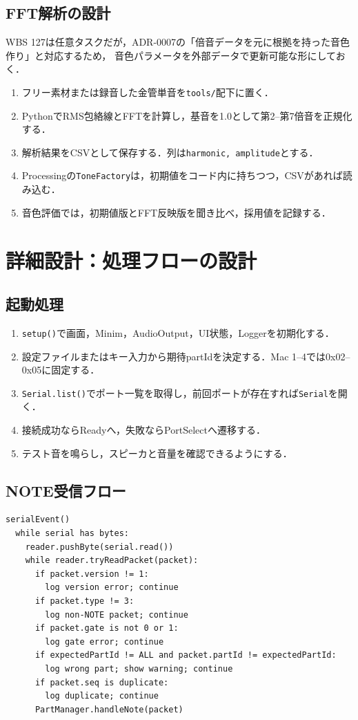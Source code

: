 \documentclass[a4paper,11pt]{jsarticle}
\begin{document}
\subsection{FFT解析の設計}

WBS 127は任意タスクだが，ADR-0007の「倍音データを元に根拠を持った音色作り」と対応するため，
音色パラメータを外部データで更新可能な形にしておく．

\begin{enumerate}
\item フリー素材または録音した金管単音を\texttt{tools/}配下に置く．
\item PythonでRMS包絡線とFFTを計算し，基音を1.0として第2--第7倍音を正規化する．
\item 解析結果をCSVとして保存する．列は\texttt{harmonic, amplitude}とする．
\item Processingの\texttt{ToneFactory}は，初期値をコード内に持ちつつ，CSVがあれば読み込む．
\item 音色評価では，初期値版とFFT反映版を聞き比べ，採用値を記録する．
\end{enumerate}

\newpage
\section{詳細設計：処理フローの設計}

\subsection{起動処理}

\begin{enumerate}
\item \texttt{setup()}で画面，Minim，AudioOutput，UI状態，Loggerを初期化する．
\item 設定ファイルまたはキー入力から期待partIdを決定する．Mac 1--4では0x02--0x05に固定する．
\item \texttt{Serial.list()}でポート一覧を取得し，前回ポートが存在すれば\texttt{Serial}を開く．
\item 接続成功ならReadyへ，失敗ならPortSelectへ遷移する．
\item テスト音を鳴らし，スピーカと音量を確認できるようにする．
\end{enumerate}

\subsection{NOTE受信フロー}

\begin{lstlisting}[style=textdiagram, caption={Serial受信から発音までの処理フロー}]
serialEvent()
  while serial has bytes:
    reader.pushByte(serial.read())
    while reader.tryReadPacket(packet):
      if packet.version != 1:
        log version error; continue
      if packet.type != 3:
        log non-NOTE packet; continue
      if packet.gate is not 0 or 1:
        log gate error; continue
      if expectedPartId != ALL and packet.partId != expectedPartId:
        log wrong part; show warning; continue
      if packet.seq is duplicate:
        log duplicate; continue
      PartManager.handleNote(packet)
\end{lstlisting}
\end{document}
